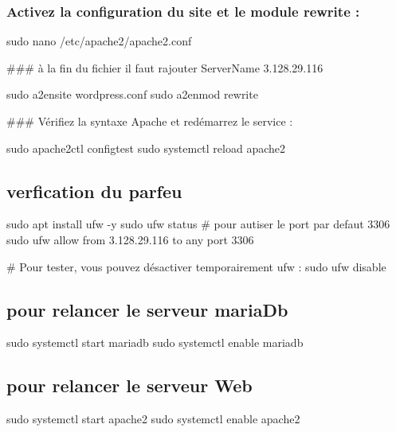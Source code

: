 \subsubsection*{Activez la configuration du site et le module rewrite \+:}


\begin{DoxyCode}
sudo nano /etc/apache2/apache2.conf

### à la fin du fichier il faut rajouter
ServerName 3.128.29.116
\end{DoxyCode}



\begin{DoxyCode}
sudo a2ensite wordpress.conf
sudo a2enmod rewrite
\end{DoxyCode}


\#\#\# Vérifiez la syntaxe Apache et redémarrez le service \+: 
\begin{DoxyCode}
sudo apache2ctl configtest
sudo systemctl reload apache2
\end{DoxyCode}


\subsection*{verfication du parfeu}


\begin{DoxyCode}
sudo apt install ufw -y
sudo ufw status
# pour autiser le port par defaut 3306
sudo ufw allow from 3.128.29.116 to any port 3306

# Pour tester, vous pouvez désactiver temporairement ufw :
sudo ufw disable
\end{DoxyCode}


\subsection*{pour relancer le serveur maria\+Db}


\begin{DoxyCode}
sudo systemctl start mariadb
sudo systemctl enable mariadb
\end{DoxyCode}


\subsection*{pour relancer le serveur Web}


\begin{DoxyCode}
sudo systemctl start apache2
sudo systemctl enable apache2
\end{DoxyCode}


